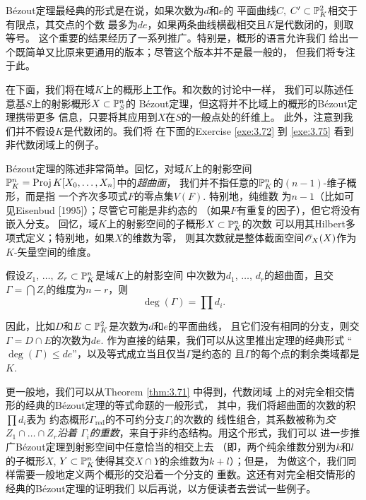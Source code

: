 B\'ezout定理最经典的形式是在说，如果次数为$d$和$e$的
平面曲线$C$, $C'\subset \P_K^2$相交于有限点，其交点的个数
最多为$de$，如果两条曲线横截相交且$K$是代数闭的，则取等号。
这个重要的结果经历了一系列推广。特别是，概形的语言允许我们
给出一个既简单又比原来更通用的版本；尽管这个版本并不是最一般的，
但我们将专注于此。

在下面，我们将在域$K$上的概形上工作。和次数的讨论中一样，
我们可以陈述任意基$S$上的射影概形$X\subset \P_S^n$的
B\'ezout定理，但这将并不比域上的概形的B\'ezout定理携带更多
信息，只要将其应用到$X$在$S$的一般点处的纤维上。
此外，注意到我们并不假设$K$是代数闭的。我们将
在下面的Exercise \ref{exe:3.72} 到 \ref{exe:3.75} 
看到非代数闭域上的例子。


B\'ezout定理的陈述非常简单。回忆，对域$K$上的射影空间
$\P_K^n=\proj K[X_0,\dots,X_n]$中的\textit{超曲面}，
我们并不指任意的$\P_K^n$的$(n-1)$-维子概形，而是指
一个齐次多项式$F$的零点集$V(F)$. 特别地，纯维数
为$n-1$（比如可见Eisenbud [1995]）；尽管它可能是非约态的
（如果$F$有重复的因子），但它将没有嵌入分支。
回忆，域$K$上的射影空间的子概形$X\subset \P_K^n$的次数
可以用其Hilbert多项式定义；特别地，如果$X$的维数为零，
则其次数就是整体截面空间$\oo_X(X)$作为$K$-矢量空间的维度。

\begin{thm}
\label{thm:3.71}
假设$Z_1$, $\dots$, $Z_r\subset \P_K^n$是域$K$上的射影空间
中次数为$d_1$, $\dots$, $d_r$的超曲面，且交
$\Gamma=\bigcap Z_i$的维度为$n-r$，则
\[
	\deg(\Gamma)=\prod d_i.
\]
\end{thm}

因此，比如$D$和$E\subset \P_K^2$是次数为$d$和$e$的平面曲线，
且它们没有相同的分支，则交$\Gamma=D\cap E$的次数为$de$. 
作为直接的结果，我们可以从这里推出定理的经典形式
“$\deg(\Gamma)\leq de$”，以及等式成立当且仅当$\Gamma$是约态的
且$\Gamma$的每个点的剩余类域都是$K$.

更一般地，我们可以从Theorem \ref{thm:3.71} 中得到，代数闭域
上的对完全相交情形的经典的B\'ezout定理的等式命题的一般形式，
其中，我们将超曲面的次数的积$\prod d_i$表为
约态概形$\Gamma_{\text{red}}$的不可约分支$\Gamma_i$的次数的
线性组合，其系数被称为\textit{交$Z_1\cap \dots\cap Z_r$沿着
$\Gamma_i$的重数}，来自于非约态结构。用这个形式，我们可以
进一步推广B\'ezout定理到射影空间中任意恰当的相交上去
（即，两个纯余维数分别为$k$和$l$的子概形$X$, 
$Y\subset \P_K^n$使得其交$X\cap Y$的余维数为$k+l$）；但是，
为做这个，我们同样需要一般地定义两个概形的交沿着一个分支的
重数。这还有对完全相交情形的经典的B\'ezout定理的证明我们
以后再说，以方便读者去尝试一些例子。

